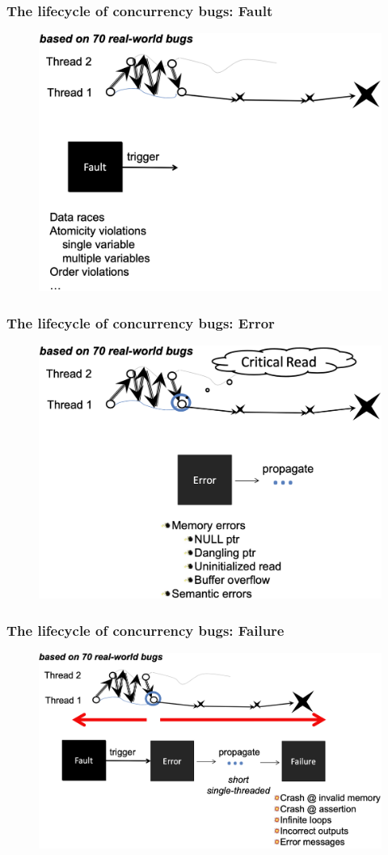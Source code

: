 % 
% 
% 
% 
\begin{frame}[fragile]
    \frametitle{The lifecycle of concurrency bugs: Fault}
    \begin{figure}
    \includegraphics[width=0.4\linewidth]{figs/fault.png}
    \end{figure}
\end{frame}
% 
% 
\begin{frame}[fragile]
    \frametitle{The lifecycle of concurrency bugs: Error}
    \begin{figure}
    \includegraphics[width=0.4\linewidth]{figs/error.png}
    \end{figure}
\end{frame}
% 
% 
\begin{frame}[fragile]
    \frametitle{The lifecycle of concurrency bugs: Failure}
    \begin{figure}
    \includegraphics[width=0.4\linewidth]{figs/failure.png}
    \end{figure}
\end{frame}
